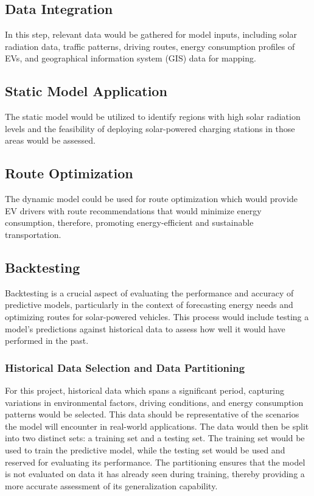 \documentclass[10pt,twocolumn]{article}
\begin{document}
\subsection{Data Integration} In this step, relevant data would be gathered for model inputs, including solar radiation data, traffic patterns, driving routes, energy consumption profiles of EVs, and geographical information system (GIS) data for mapping.
\subsection{Static Model Application}
The static model would be utilized to identify regions with high solar radiation levels and the feasibility of deploying solar-powered charging stations in those areas would be assessed.
\subsection{Route Optimization}
The dynamic model could be used for route optimization which would provide EV drivers with route recommendations that would minimize energy consumption, therefore, promoting energy-efficient and sustainable transportation.

\subsection{Backtesting}
Backtesting is a crucial aspect of evaluating the performance and accuracy of predictive models, particularly in the context of forecasting energy needs and optimizing routes for solar-powered vehicles. This process would include testing a model's predictions against historical data to assess how well it would have performed in the past. 
\subsubsection{Historical Data Selection and Data Partitioning}For this project, historical data which spans a significant period, capturing variations in environmental factors, driving conditions, and energy consumption patterns would be selected. This data should be representative of the scenarios the model will encounter in real-world applications. The data would then be split into two distinct sets: a training set and a testing set. The training set would be used to train the predictive model, while the testing set would be used and reserved for evaluating its performance. The partitioning ensures that the model is not evaluated on data it has already seen during training, thereby providing a more accurate assessment of its generalization capability.
\end{document}
